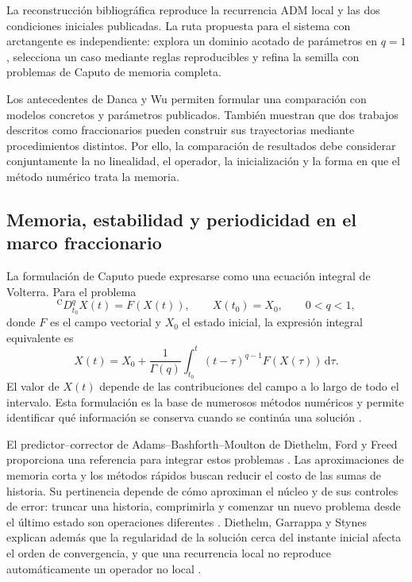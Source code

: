 La reconstrucción bibliográfica reproduce la recurrencia ADM local y las dos
condiciones iniciales publicadas. La ruta propuesta para el sistema con
arctangente es independiente: explora un dominio acotado de parámetros en
\(q=1\), selecciona un caso mediante reglas reproducibles y refina la semilla
con problemas de Caputo de memoria completa.

Los antecedentes de Danca y Wu permiten formular una comparación con
modelos concretos y parámetros publicados. También muestran que dos
trabajos descritos como fraccionarios pueden construir sus trayectorias
mediante procedimientos distintos. Por ello, la comparación de resultados
debe considerar conjuntamente la no linealidad, el operador, la
inicialización y la forma en que el método numérico trata la memoria.

\subsection{Memoria, estabilidad y periodicidad en el marco fraccionario}

La formulación de Caputo puede expresarse como una ecuación integral de
Volterra. Para el problema
\[
{}^{\mathrm C}D_{t_0}^{q}X(t)=F(X(t)),\qquad X(t_0)=X_0,
\qquad 0<q<1,
\]
donde \(F\) es el campo vectorial y \(X_0\) el estado inicial, la expresión
integral equivalente es
\[
X(t)=X_0+\frac{1}{\Gamma(q)}
\int_{t_0}^{t}(t-\tau)^{q-1}F(X(\tau))\,\mathrm d\tau.
\]
El valor de \(X(t)\) depende de las contribuciones del campo a lo largo de
todo el intervalo. Esta formulación es la base de numerosos métodos
numéricos y permite identificar qué información se conserva cuando se
continúa una solución \cite{Diethelm2010AnalysisFDE,DiethelmFordFreed2002}.

El predictor--corrector de Adams--Bashforth--Moulton de Diethelm, Ford y
Freed proporciona una referencia para integrar estos problemas
\cite{DiethelmFordFreed2002}. Las aproximaciones de memoria corta y los
métodos rápidos buscan reducir el costo de las sumas de historia. Su
pertinencia depende de cómo aproximan el núcleo y de sus controles de error:
truncar una historia, comprimirla y comenzar un nuevo problema desde el
último estado son operaciones diferentes
\cite{Deng2007,KhristenkoWohlmuth2023Rational,JiangZhangZhangZhang2017FastCaputo}.
Diethelm, Garrappa y Stynes explican además que la regularidad de la solución
cerca del instante inicial afecta el orden de convergencia, y que una
recurrencia local no reproduce automáticamente un operador no local
\cite{Diethelm2020_afcee}.

